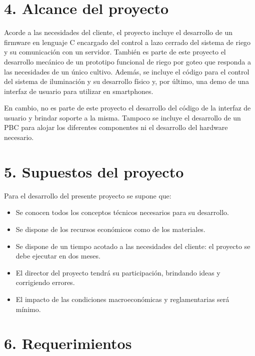 \documentclass[
11pt, %
]{charter}
\begin{document}
\section{4. Alcance del proyecto}
\label{sec:alcance}

Acorde a las necesidades del cliente, el proyecto incluye el desarrollo de un firmware en lenguaje C encargado del control a lazo cerrado del sistema de riego y su comunicación con un servidor. También es parte de este proyecto el desarrollo mecánico de un prototipo funcional de riego por goteo que responda a las necesidades de un único cultivo. Además, se incluye el código para el control del sistema de iluminación y su desarrollo físico y, por último, una demo de una interfaz de usuario para utilizar en smartphones.

En cambio, no es parte de este proyecto el desarrollo del código de la interfaz de usuario y brindar soporte a la misma. Tampoco se incluye el desarrollo de un PBC para alojar los diferentes componentes ni el desarrollo del hardware necesario.


\section{5. Supuestos del proyecto}
\label{sec:supuestos}

Para el desarrollo del presente proyecto se supone que:

\begin{itemize}
	\item Se conocen todos los conceptos técnicos necesarios para su desarrollo. 
	\item Se dispone de los recursos económicos como de los materiales.
	\item Se dispone de un tiempo acotado a las necesidades del cliente: el proyecto se debe ejecutar en dos meses.
	\item El director del proyecto tendrá su participación, brindando ideas y corrigiendo errores.
	\item El impacto de las condiciones macroeconómicas y reglamentarias será mínimo.
\end{itemize}

\section{6. Requerimientos}
\label{sec:requerimientos}
\end{document}
